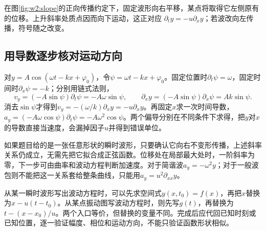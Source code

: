 
在图\ref{fig:w2:slope}的正向传播约定下，固定波形向右平移，某点将取得它左侧原有的位移。上升斜率处质点因而向下运动，这正对应 $\partial_t y=-u\partial_x y$；若波改向左传播，符号随之改变。

\subsection{用导数逐步核对运动方向}
对$y=A\cos(\omega t-kx+\varphi_0)$，令$\psi=\omega t-kx+\varphi_0$。固定位置时$\partial_t\psi=\omega$，固定时间时$\partial_x\psi=-k$；分别用链式法则，
\[
v_y=(-A\sin\psi)\partial_t\psi=-A\omega\sin\psi,
\qquad \partial_xy=(-A\sin\psi)\partial_x\psi=Ak\sin\psi.
\]
消去$\sin\psi$才得到$v_y=-(\omega/k)\partial_xy=-u\partial_xy$。再固定$x$求一次时间导数，$a_y=(-A\omega\cos\psi)\partial_t\psi=-A\omega^2\cos\psi$。两个偏导分别在不同条件下求得，把$y$对$x$的导数直接当速度，会漏掉因子$u$并得到错误单位。

如果题目给的是一张任意形状的瞬时波形，只要确认它向右不变形传播，上述斜率关系仍成立，无需先把它拟合成正弦函数。位移处在局部最大处时，一阶斜率为零，下一步可由曲率和波动方程判断加速度。对于简谐波$a_y=-\omega^2y$；对于一般波包则不能把这一关系套给整条曲线，只能用$a_y=u^2\partial_{xx}y$。

从某一瞬时波形写出波动方程时，可以先求空间式$y(x,t_0)=f(x)$，再把$x$替换为$x-u(t-t_0)$。从某点振动图写波动方程时，则先写$g(t)$，再替换为$t-(x-x_0)/u$。两个入口等价，但替换的变量不同。完成后应代回已知时刻或已知位置，逐一验证幅度、相位和运动方向，不能只验证函数形状相似。


